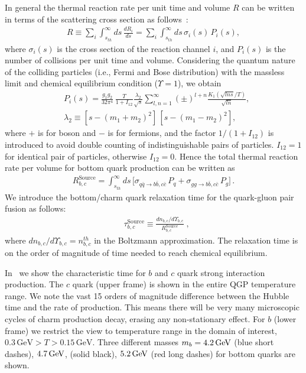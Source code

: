 In general the thermal reaction rate per unit time and volume $R$ can be written in terms of the scattering cross section as follows~\cite{Letessier:2002ony}:
\begin{align}
R\equiv\sum_i\int_{s_{th}}^\infty\!ds\,\frac{dR_i}{ds}=\sum_i\int_{s_{th}}^\infty\!ds\,\sigma_i(s)\,P_i(s),
\end{align}
where $\sigma_i(s)$ is the cross section of the reaction channel $i$, and $P_i(s)$ is the number of collisions per unit time and volume. Considering the quantum nature of the colliding particles (i.e., Fermi and Bose distribution) with the massless limit and chemical equilibrium condition ($\Upsilon=1$), we obtain~\cite{Letessier:2002ony}
\begin{align}
&P_i(s)=\frac{g_1g_2}{32\pi^4}\,\frac{T}{1+I_{12}}\frac{\lambda_2}{\sqrt{s}}\!\sum_{l,n=1}^{\infty}\!(\pm)^{l+n}\frac{K_1(\sqrt{lns}/T)}{\sqrt{ln}},\\
&\lambda_2\equiv\left[s-\left(m_1+m_2\right)^2\right]\,\left[s-\left(m_1-m_2\right)^2\right],
\end{align}
where $+$ is for boson and $-$ is for fermions, and the factor $1/(1+I_{12})$ is introduced to avoid double counting of indistinguishable pairs of particles. $I_{12}=1$ for identical pair of particles, otherwise $I_{12}=0$. Hence the total thermal reaction rate per volume for bottom quark production can be written as
\begin{align}
\label{Bquark_Source}
R^{\mathrm{Source}}_{b,c}=\int^\infty_{s_{th}}ds\,\bigg[\sigma_{q\bar{q}\rightarrow b\bar{b},c\bar{c}}\,P_q+\sigma_{gg\rightarrow b\bar{b},c\bar{c}}\,P_g\bigg]
\,.
\end{align}
We introduce the bottom/charm quark relaxation time for the quark-gluon pair fusion as follows:
\begin{align}
\label{relaxation_time}
&{\tau_{b,c}^{\mathrm{Source}}}\equiv\frac{dn_{b,c}/d\Upsilon_{b,c}}{R^{\mathrm{Source}}_{b,c}}\;,
\end{align}
where $dn_{b,c}/d\Upsilon_{b,c}=n^{th}_{b,c}$ in the Boltzmann approximation. The relaxation time is on the order of magnitude of time needed to reach chemical equilibrium. 

In~ we show the characteristic time for $b$ and $c$ quark strong interaction production. The $c$ quark (upper frame) is shown in the entire QGP temperature range. We note the vast 15 orders of magnitude difference between the Hubble time and the rate of production. This means there will be very many microscopic cycles of charm production decay, erasing any non-stationary effect. For $b$ (lower frame) we restrict the view to temperature range in the domain of interest, $ 0.3\,\mathrm{GeV}>T> 0.15\,\mathrm{GeV}$. Three different masses $m_{b}=4.2\text{\,GeV}$ (blue short dashes), $4.7\text{\,GeV}$, (solid black), $5.2\text{\,GeV}$ (red long dashes) for bottom quarks are shown. 
 
